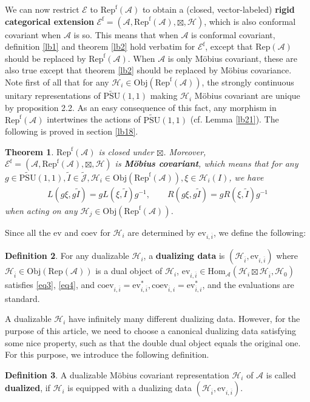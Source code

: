 \documentclass[12pt,a4paper]{article}
\theoremstyle{definition}
\newtheorem{df}{Definition}[section]
\theoremstyle{plain}
\newtheorem{thm}[df]{Theorem}
\newcommand{\mc}{\mathcal}
\newcommand{\wtd}{\widetilde}
\newcommand{\ovl}{\overline}
\newcommand{\Hom}{\mathrm{Hom}}
\newcommand{\ev}{\mathrm{ev}}
\newcommand{\coev}{\mathrm{coev}}
\newcommand{\UPSU}{\widetilde{\mathrm{PSU}}(1,1)}
\newcommand{\scr}{\mathscr}
\newcommand{\RepA}{\mathrm{Rep}(\mc A)}
\newcommand{\RepfA}{\mathrm{Rep}^{\mathrm f}(\mc A)}
\newcommand{\Obj}{\mathrm{Obj}}
\newcommand{\Ef}{\mathscr E^{\mathrm f}}
\numberwithin{equation}{section}
\begin{document}
We can now restrict $\scr E$ to $\RepfA$ to obtain a (closed, vector-labeled) \textbf{rigid categorical extension} $\Ef=(\mc A,\RepfA,\boxtimes,\mc H)$, which is also conformal covariant when $\mc A$ is so. This means that when $\mc A$ is conformal covariant, definition \ref{lb1} and theorem \ref{lb2} hold verbatim for $\Ef$, except that $\RepA$ should be replaced by $\RepfA$. When $\mc A$ is only M\"obius covariant, these are also true except that theorem \ref{lb2} should be replaced by M\"obius covariance. Note first of all that for any $\mc H_i\in\Obj(\RepfA)$, the strongly continuous unitary representations of $\UPSU$ making $\mc H_i$ M\"obius covariant are unique by \cite{GL96} proposition 2.2. As an easy consequence of this fact, any morphism in $\RepfA$ intertwines the actions of $\UPSU$ (cf. Lemma \ref{lb21}). The following is proved in section \ref{lb18}.
\begin{thm}\label{lb19}
	$\RepfA$ is closed under $\boxtimes$. Moreover, $\Ef=(\mc A,\RepfA,\boxtimes,\mc H)$ is \textbf{M\"obius covariant}, which means that for any $g\in\UPSU,\wtd I\in\wtd{\mc J},\mc H_i\in\Obj(\RepfA),\xi\in\mc H_i(I)$, we have
	\begin{align}
		L(g\xi,g\wtd I)=gL(\xi,\wtd I)g^{-1},\qquad R(g\xi,g\wtd I)=gR(\xi,\wtd I)g^{-1}\label{eq52}
	\end{align}
	when acting on any $\mc H_j\in\Obj(\RepfA)$.
\end{thm}

Since all the $\ev$ and $\coev$ for $\mc H_i$ are determined by $\ev_{i,\ovl i}$, we define the following:



\begin{df}
For any dualizable $\mc H_i$, a \textbf{dualizing data} is $(\mc H_{\ovl i},\ev_{i,\ovl i})$ where $\mc H_{\ovl i}\in\Obj(\RepA)$ is a dual object of $\mc H_i$,  $\ev_{i,\ovl i}\in\Hom_{\mc A}(\mc H_i\boxtimes\mc H_{\ovl i},\mc H_0)$ satisfies \eqref{eq3}, \eqref{eq4}, and $\coev_{i,\ovl i}=\ev_{i,\ovl i}^*,\coev_{\ovl i,i}=\ev_{\ovl i,i}^*$, and the evaluations are standard.
\end{df}


A dualizable $\mc H_i$ have infinitely many different dualizing data. However, for the purpose of this article, we need to choose a canonical dualizing data satisfying some nice property, such as that the double dual object equals the original one. For this purpose, we introduce the following definition.

\begin{df}
A dualizable M\"obius covariant representation $\mc H_i$ of $\mc A$ is called \textbf{dualized}, if $\mc H_i$ is equipped with a dualizing data $(\mc H_{\ovl i},\ev_{i,\ovl i})$.
\end{df}
\end{document}
